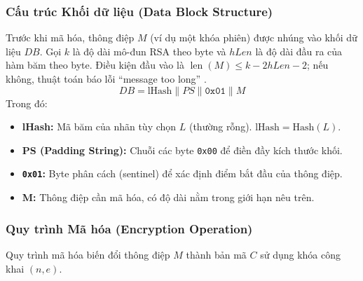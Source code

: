 \subsubsection{Cấu trúc Khối dữ liệu (Data Block Structure)}
Trước khi mã hóa, thông điệp $M$ (ví dụ một khóa phiên) được nhúng vào khối dữ liệu $DB$. Gọi $k$ là độ dài mô-đun RSA theo byte và $hLen$ là độ dài đầu ra của hàm băm theo byte. Điều kiện đầu vào là $\operatorname{len}(M)\leq k-2hLen-2$; nếu không, thuật toán báo lỗi ``message too long'' \cite{rsa8017}.
\begin{equation}
    DB = \text{lHash} \parallel PS \parallel \texttt{0x01} \parallel M
\end{equation}
Trong đó:
\begin{itemize}
    \item \textbf{lHash:} Mã băm của nhãn tùy chọn $L$ (thường rỗng). $\text{lHash} = \text{Hash}(L)$.
    \item \textbf{PS (Padding String):} Chuỗi các byte \texttt{0x00} để điền đầy kích thước khối.
    \item \textbf{\texttt{0x01}:} Byte phân cách (sentinel) để xác định điểm bắt đầu của thông điệp.
    \item \textbf{M:} Thông điệp cần mã hóa, có độ dài nằm trong giới hạn nêu trên.
\end{itemize}

\subsubsection{Quy trình Mã hóa (Encryption Operation)}
Quy trình mã hóa biến đổi thông điệp $M$ thành bản mã $C$ sử dụng khóa công khai $(n, e)$.

